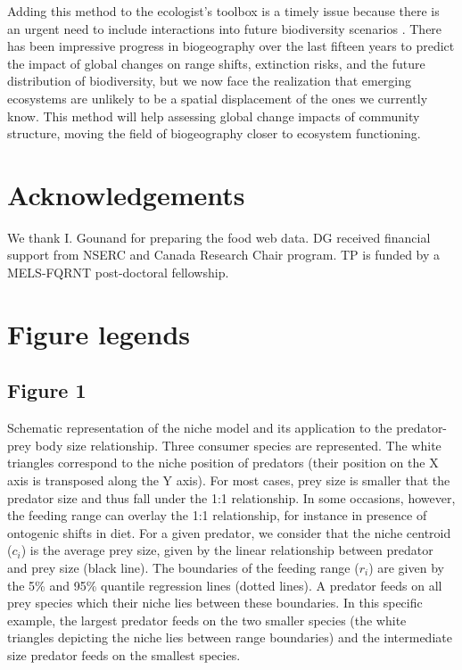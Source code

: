 \documentclass[12pt]{article}
\begin{document}
Adding this method to the ecologist's toolbox is a timely issue because there is an urgent need to include interactions into future biodiversity scenarios \parencite{Thuiller2013}. There has been impressive progress in biogeography over the last fifteen years to predict the impact of global changes on range shifts, extinction risks, and the future distribution of biodiversity, but we now face the realization that emerging ecosystems are unlikely to be a spatial displacement of the ones we currently know. This method will help assessing global change impacts of community structure, moving the field of biogeography closer to ecosystem functioning. 

\section{Acknowledgements}
We thank I. Gounand for preparing the food web data. DG received financial support from NSERC and Canada Research Chair program. TP is funded by a MELS-FQRNT post-doctoral fellowship.
\newpage

\printbibliography
\newpage

\section*{Figure legends}

\subsection*{Figure 1}
Schematic representation of the niche model and its application to the predator-prey body size relationship. Three consumer species are represented. The white triangles correspond to the niche position of predators (their position on the X axis is transposed along the Y axis). For most cases, prey size is smaller that the predator size and thus fall under the 1:1 relationship. In some occasions, however, the feeding range can overlay the 1:1 relationship, for instance in presence of ontogenic shifts in diet. For a given predator, we consider that the niche centroid ($c_i$) is the average prey size, given by the linear relationship between predator and prey size (black line). The boundaries of the feeding range ($r_i$) are given by the 5\% and 95\% quantile regression lines (dotted lines). A predator feeds on all prey species which their niche lies between these boundaries. In this specific example, the largest predator feeds on the two smaller species (the white triangles depicting the niche lies between range boundaries) and the intermediate size predator feeds on the smallest species.
\end{document}

